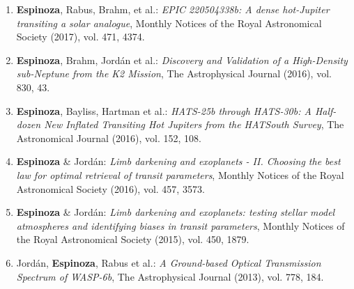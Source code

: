 \documentclass[12pt, a4paper]{article} %
\begin{document}
\begin{flushleft}
\begin{enumerate}
\item \textbf{Espinoza}, Rabus, Brahm, et al.: \textit{EPIC 220504338b: A dense hot-Jupiter transiting a solar analogue}, Monthly Notices of the Royal Astronomical Society (2017), vol. 471, 4374.
\item \textbf{Espinoza}, Brahm, Jord\'an et al.: \textit{Discovery and Validation of a High-Density sub-Neptune from the K2 Mission}, The Astrophysical Journal (2016), vol. 830, 43.
\item \textbf{Espinoza}, Bayliss, Hartman et al.: \textit{HATS-25b through HATS-30b: A Half-dozen New Inflated Transiting Hot Jupiters from the HATSouth Survey}, The Astronomical Journal (2016), vol. 152, 108.
\item \textbf{Espinoza} \& Jord\'an: \textit{Limb darkening and exoplanets - II. Choosing the best law for optimal retrieval of transit parameters}, Monthly Notices of the Royal Astronomical Society (2016), vol. 457, 3573.
\item \textbf{Espinoza} \& Jord\'an: \textit{Limb darkening and exoplanets: testing stellar model atmospheres and identifying biases in transit parameters}, Monthly Notices of the Royal Astronomical Society (2015), vol. 450, 1879.
\item Jord\'an, \textbf{Espinoza}, Rabus et al.: \textit{A Ground-based Optical Transmission Spectrum of WASP-6b}, The Astrophysical Journal (2013), vol. 778, 184.
\end{enumerate}


\end{flushleft}
\end{document}
